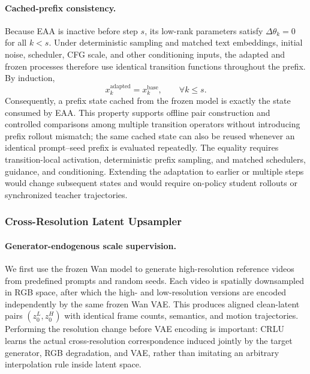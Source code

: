 \paragraph{Cached-prefix consistency.}
\label{sec:cached}
Because EAA is inactive before step \(s\), its low-rank parameters satisfy
\(\Delta\theta_k=0\) for all \(k<s\). Under deterministic sampling and
matched text embeddings, initial noise, scheduler, CFG scale, and other
conditioning inputs, the adapted and frozen processes therefore use
identical transition functions throughout the prefix. By induction,
\[
x_k^{\mathrm{adapted}}=x_k^{\mathrm{base}},
\qquad \forall k\leq s.
\]
Consequently, a prefix state cached from the frozen model is exactly the
state consumed by EAA. This property supports offline pair construction
and controlled comparisons among multiple transition operators without
introducing prefix rollout mismatch; the same cached state can also be
reused whenever an identical prompt--seed prefix is evaluated repeatedly.
The equality requires transition-local activation, deterministic prefix
sampling, and matched schedulers, guidance, and conditioning. Extending
the adaptation to earlier or multiple steps would change subsequent
states and would require on-policy student rollouts or synchronized
teacher trajectories.

\subsubsection{Cross-Resolution Latent Upsampler}
\label{sec:crlu}

\paragraph{Generator-endogenous scale supervision.}
We first use the frozen Wan model to generate high-resolution reference
videos from predefined prompts and random seeds. Each video is spatially
downsampled in RGB space, after which the high- and low-resolution
versions are encoded independently by the same frozen Wan VAE. This
produces aligned clean-latent pairs \((z_0^L,z_0^H)\) with identical frame
counts, semantics, and motion trajectories. Performing the resolution
change before VAE encoding is important: CRLU learns the actual
cross-resolution correspondence induced jointly by the target generator,
RGB degradation, and VAE, rather than imitating an arbitrary interpolation
rule inside latent space.

